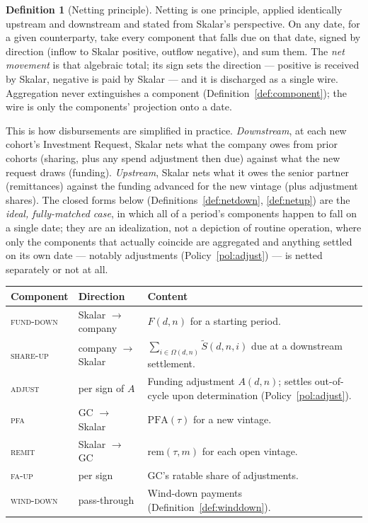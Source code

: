 \documentclass[11pt, a4paper]{article}
\theoremstyle{definition}
\newtheorem{definition}{Definition}[section]
\newcommand{\PFA}{\mathrm{PFA}}                   %
\newcommand{\rem}{\mathrm{rem}}                   %
\newcommand{\Stil}{\tilde{S}}                     %
\newcommand{\OO}{\Omega}                          %
\begin{document}
\begin{definition}[Netting principle]\label{def:netprinciple}
Netting is one principle, applied identically upstream and downstream and stated from Skalar's perspective. On any date, for a given counterparty, take every component that falls due on that date, signed by direction (inflow to Skalar positive, outflow negative), and sum them. The \emph{net movement} is that algebraic total; its sign sets the direction --- positive is received by Skalar, negative is paid by Skalar --- and it is discharged as a single wire. Aggregation never extinguishes a component (Definition~\ref{def:component}); the wire is only the components' projection onto a date.

This is how disbursements are simplified in practice. \emph{Downstream}, at each new cohort's Investment Request, Skalar nets what the company owes from prior cohorts (sharing, plus any spend adjustment then due) against what the new request draws (funding). \emph{Upstream}, Skalar nets what it owes the senior partner (remittances) against the funding advanced for the new vintage (plus adjustment shares). The closed forms below (Definitions~\ref{def:netdown}, \ref{def:netup}) are the \emph{ideal, fully-matched case}, in which all of a period's components happen to fall on a single date; they are an idealization, not a depiction of routine operation, where only the components that actually coincide are aggregated and anything settled on its own date --- notably adjustments (Policy~\ref{pol:adjust}) --- is netted separately or not at all.
\end{definition}

\begin{center}
\begin{tabular}{@{} L{2.6cm} L{3.6cm} L{7.6cm} @{}}
\toprule
\textbf{Component} & \textbf{Direction} & \textbf{Content} \\
\midrule
\textsc{fund-down} & Skalar $\to$ company & $F(d, n)$ for a starting period. \\[3pt]
\textsc{share-up} & company $\to$ Skalar & $\sum_{i \in \OO(d,n)} \Stil(d, n, i)$ due at a downstream settlement. \\[3pt]
\textsc{adjust} & per sign of $A$ & Funding adjustment $A(d, n)$; settles out-of-cycle upon determination (Policy~\ref{pol:adjust}). \\[3pt]
\textsc{pfa} & GC $\to$ Skalar & $\PFA(\tau)$ for a new vintage. \\[3pt]
\textsc{remit} & Skalar $\to$ GC & $\rem(\tau, m)$ for each open vintage. \\[3pt]
\textsc{fa-up} & per sign & GC's ratable share of adjustments. \\[3pt]
\textsc{wind-down} & pass-through & Wind-down payments (Definition~\ref{def:winddown}). \\
\bottomrule
\end{tabular}
\end{center}
\end{document}
